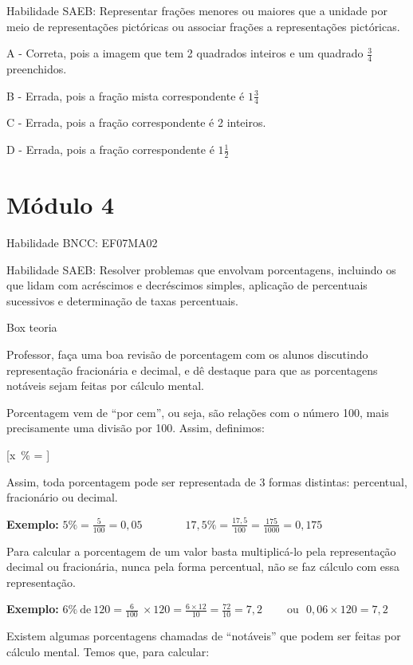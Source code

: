 Habilidade SAEB: Representar frações menores ou maiores que a unidade
por meio de representações pictóricas ou associar frações a
representações pictóricas.

A - Correta, pois a imagem que tem 2 quadrados inteiros e um quadrado
\(\frac{3}{4}\) preenchidos.

B - Errada, pois a fração mista correspondente é \(1\frac{3}{4}\)

C - Errada, pois a fração correspondente é 2 inteiros.

D - Errada, pois a fração correspondente é \(1\frac{1}{2}\)

\section{Módulo 4}

Habilidade BNCC: EF07MA02

Habilidade SAEB: Resolver problemas que envolvam porcentagens, incluindo
os que lidam com acréscimos e decréscimos simples, aplicação de
percentuais sucessivos e determinação de taxas percentuais.

Box teoria

Professor, faça uma boa revisão de porcentagem com os alunos discutindo
representação fracionária e decimal, e dê destaque para que as
porcentagens notáveis sejam feitas por cálculo mental.

Porcentagem vem de ``por cem'', ou seja, são relações com o número 100,
mais precisamente uma divisão por 100. Assim, definimos:

[x\ \% = ]

Assim, toda porcentagem pode ser representada de 3 formas distintas:
percentual, fracionário ou decimal.

\textbf{Exemplo:} \(5\% = \frac{5}{100} = 0,05\)
\(\ \ \ \ \ \ \ \ \ \ \ \ \ \ \ \ 17,5\% = \frac{17,5}{100} = \frac{175}{1000} = 0,175\)

Para calcular a porcentagem de um valor basta multiplicá-lo pela
representação decimal ou fracionária, nunca pela forma percentual, não
se faz cálculo com essa representação.

\textbf{Exemplo:}
\(6\%\ \text{de}\ 120 = \frac{6}{100}\  \times 120 = \frac{6 \times 12}{10} = \frac{72}{10} = 7,2\ \ \ \ \ \ \ \ \ \ \text{ou}\ \ \ 0,06 \times 120 = 7,2\)

Existem algumas porcentagens chamadas de ``notáveis'' que podem ser
feitas por cálculo mental. Temos que, para calcular:

